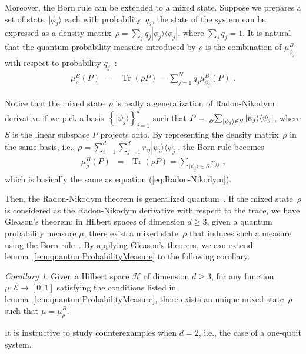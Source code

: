 \documentclass{article}
\theoremstyle{remark}
\newtheorem{cor}{Corollary}
\newcommand{\events}{\ensuremath{\mathcal{E}}}
\newcommand{\Hilb}{\mathcal{H}}
\newcommand{\ket}[1]{|#1\rangle}
\newcommand{\bra}[1]{\langle#1|}
\newcommand{\proj}[1]{|#1 \rangle\langle #1 |}
\newcommand{\Tr}{\mathop{\mathrm{Tr}}\nolimits}
\begin{document}
Moreover, the Born rule can be extended to a mixed state. Suppose
we prepares a set of state~$\ket{\phi_{j}}$ each with probability~$q_{j}$,
the state of the system can be expressed as a density matrix~$\rho=\sum_{j}q_{j}\proj{\phi_{j}}$,
where $\sum_{j}q_{j}=1$. It is natural that the quantum probability
measure introduced by $\rho$ is the combination of $\mu_{\phi_{j}}^{B}$
with respect to probability $q_{j}$~\cite{peres1995quantum,544199,RiederSvozil2007}:
\begin{eqnarray}
\mu_{\rho}^{B}\left(P\right) & = & \Tr\left(\rho P\right)=\sum_{j=1}^{N}q_{j}\mu_{\phi_{j}}^{B}\left(P\right)\textrm{ .}\label{BornRule.mixed}
\end{eqnarray}

Notice that the mixed state~$\rho$ is really a generalization of
Radon-Nikodym derivative if we pick a basis~$\left\{ \ket{\psi_{j}}\right\} _{j=1}^{d}$
such that $P=\tensor*[_{\mathscr{O}}]{\sum}{_{\ket{\psi_{j}}\in S}}\proj{\psi_{j}}$,
where $S$ is the linear subspace $P$ projects onto. By representing
the density matrix~$\rho$ in the same basis, i.e., $\rho=\sum_{i=1}^{d}\sum_{j=1}^{d}r_{ij}\ket{\psi_{i}}\bra{\psi_{j}}$,
the Born rule becomes
\begin{eqnarray}
\mu_{\rho}^{B}\left(P\right) & = & \Tr\left(\rho P\right)=\sum_{\ket{\psi_{j}}\in S}r_{jj}\textrm{ ,}\label{BornRule.mixed-1}
\end{eqnarray}
 which is basically the same as equation (\ref{eq:Radon-Nikodym}).

Then, the Radon-Nikodym theorem is generalized quantum~\cite{HollandJr1970,Redhead1987-REDINA,Jaeger2007}.
If the mixed state~$\rho$ is considered as the Radon-Nikodym derivative
with respect to the trace, we have Gleason's theorem: in Hilbert spaces
of dimension $d\geq3$, given a quantum probability measure $\mu$,
there exist a mixed state~$\rho$ that induces such a measure using
the Born rule~\cite{gleason1957,Redhead1987-REDINA,peres1995quantum}.
By applying Gleason's theorem, we can extend lemma~\ref{lem:quantumProbabilityMeasure}
to the following corollary.

\begin{cor}\label{cor:Gleason's}Given a Hilbert space $\Hilb$ of
dimension $d\geq3$, for any function~$\mu:\events\rightarrow[0,1]$
satisfying the conditions listed in lemma~\ref{lem:quantumProbabilityMeasure},
there exists an unique mixed state~$\rho$ such that $\mu=\mu_{\rho}^{B}$.\end{cor}

It is instructive to study counterexamples when $d=2$, i.e., the
case of a one-qubit system.
\end{document}
